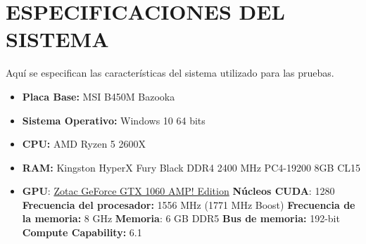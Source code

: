 \chapter{ESPECIFICACIONES DEL SISTEMA}
Aquí se especifican las características del sistema utilizado para las pruebas.

\begin{itemize}
\item \textbf{Placa Base:} MSI B450M Bazooka
\item \textbf{Sistema Operativo:} Windows 10 64 bits
\item \textbf{CPU:} AMD Ryzen 5 2600X
\item \textbf{RAM:} Kingston HyperX Fury Black DDR4 2400 MHz PC4-19200 8GB CL15
\item \textbf{GPU}: \underline{Zotac GeForce GTX 1060 AMP! Edition}
\subitem \textbf{Núcleos CUDA}: 1280
\subitem \textbf{Frecuencia del procesador:} 1556 MHz (1771 MHz Boost)
\subitem \textbf{Frecuencia de la memoria:} 8 GHz
\subitem \textbf{Memoria}: 6 GB DDR5
\subitem \textbf{Bus de memoria:} 192-bit
\subitem \textbf{Compute Capability:} 6.1


\end{itemize}